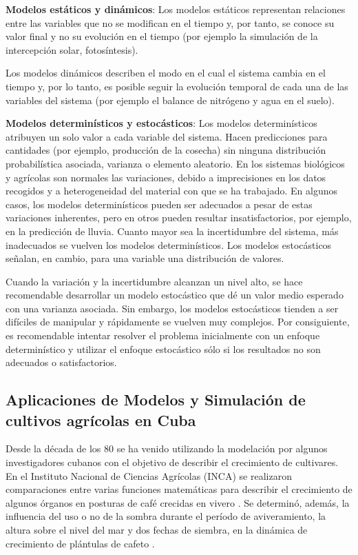 \textbf{Modelos estáticos y dinámicos}: Los modelos estáticos representan relaciones entre las variables que no se modifican en el tiempo y, por tanto, se conoce su valor final y no su evolución en el tiempo (por ejemplo la simulación de la intercepción solar, fotosíntesis). \parencite{bandi2003instrumentos}

Los modelos dinámicos describen el modo en el cual el sistema cambia en el tiempo y, por lo tanto, es posible seguir la evolución temporal de cada una de las variables del sistema (por ejemplo el balance de nitrógeno y agua en el suelo). \parencite{bandi2003instrumentos}

\textbf{Modelos determinísticos y estocásticos}: Los modelos determinísticos atribuyen un solo valor a cada variable del sistema. \parencite{bandi2003instrumentos} Hacen predicciones para cantidades (por ejemplo, producción de la cosecha) sin ninguna distribución probabilística asociada, varianza o elemento aleatorio. En los sistemas biológicos y agrícolas son normales las variaciones, debido a imprecisiones en los datos recogidos y a heterogeneidad del material con que se ha trabajado. En algunos casos, los modelos determinísticos pueden ser adecuados a pesar de estas variaciones inherentes, pero en otros pueden resultar insatisfactorios, por ejemplo, en la predicción de lluvia. Cuanto mayor sea la incertidumbre del sistema, más inadecuados se vuelven los modelos determinísticos. \parencite{galvez2008modelacion} Los modelos estocásticos señalan, en cambio, para una variable una distribución de valores. \parencite{bandi2003instrumentos}

Cuando la variación y la incertidumbre alcanzan un nivel alto, se hace recomendable desarrollar un modelo estocástico que dé un valor medio esperado con una varianza asociada. Sin embargo, los modelos estocásticos tienden a ser difíciles de manipular y rápidamente se vuelven muy complejos. Por consiguiente, es recomendable intentar resolver el problema inicialmente con un enfoque determinístico y utilizar el enfoque estocástico sólo si los resultados no son adecuados o satisfactorios. \parencite{galvez2008modelacion, hernandez2009modelos}


\subsection{Aplicaciones de Modelos y Simulación de cultivos agrícolas en Cuba}

Desde la década de los 80 se ha venido utilizando la modelación por algunos investigadores cubanos con el objetivo de describir el crecimiento de cultivares. En el Instituto Nacional de Ciencias Agrícolas (INCA) se realizaron comparaciones entre varias funciones matemáticas para describir el crecimiento de algunos órganos en posturas de café crecidas en vivero \parencite{soto1986crecimiento}. Se determinó, además, la influencia del uso o no de la sombra durante el período de aviveramiento, la altura sobre el nivel del mar y dos fechas de siembra, en la dinámica de crecimiento de plántulas de cafeto \parencite{soto1991dlnamlca, hernandez2009modelos, rodriguez2018aplicaciones}.

